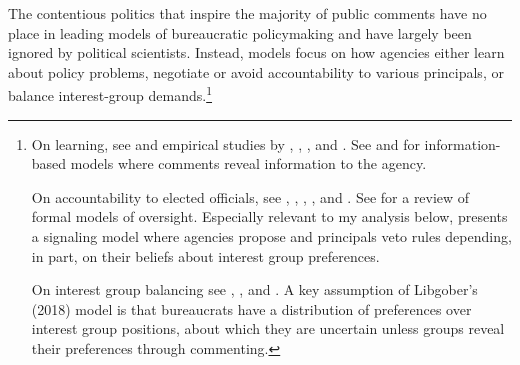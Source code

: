 The contentious politics that inspire the majority of public comments have no place in leading models of bureaucratic policymaking and have largely been ignored by political scientists.
Instead, models focus on how agencies either learn about policy problems, negotiate or avoid accountability to various principals, or balance interest-group demands.\footnote{
On learning, see \citet{Kerwin2011} and empirical studies by \citet{yackee2012}, \citet{Cook2017}, \citep{Gordon2018}, and \citet{Walters2019}. See \citet{Gailmard2017} and \citet{Libgober2018} for information-based models where comments reveal information to the agency. 

On accountability to elected officials, see  \citet{Furlong1997}, \citet{Nou2016}, \citet{Potter2016}, \citet{Woods2018}, and \citet{Yackee2009RegGov}. See \cite{Gailmard2012} for a review of formal models of oversight.
Especially relevant to my analysis below, \citet{Potter2014dis} presents a signaling model where agencies propose and principals veto rules depending, in part, on their beliefs about interest group preferences. 

On interest group balancing see \citet{Yackee2006JOP},  \citet{Yackee2006JPART}, and \citet{Kerwin2011}. A key assumption of Libgober's (2018) model is that bureaucrats have a distribution of preferences over interest group positions, about which they are uncertain unless groups reveal their preferences through commenting.
} 


